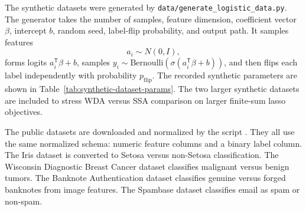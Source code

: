 \documentclass[11pt]{article}
\begin{document}
The synthetic datasets were generated by \texttt{data/generate\_logistic\_data.py}.
The generator takes the number of samples, feature dimension, coefficient
vector \(\beta\), intercept \(b\), random seed, label-flip probability, and
output path.  It samples features
\[
    a_i\sim N(0,I),
\]
forms logits \(a_i^{\mathsf T}\beta+b\), samples
\(y_i\sim\mathrm{Bernoulli}(\sigma(a_i^{\mathsf T}\beta+b))\), and then flips
each label independently with probability \(p_{\mathrm{flip}}\).  The recorded
synthetic parameters are shown in Table~\ref{tab:synthetic-dataset-params}.
The two larger synthetic datasets are included to stress WDA
versus SSA comparison on larger finite-sum lasso objectives.

The public datasets are downloaded and normalized by the script
.  They all use the same normalized
schema: numeric feature columns and a binary label column.  The Iris dataset is
converted to Setosa versus non-Setosa classification.  The Wisconsin Diagnostic
Breast Cancer dataset classifies malignant versus benign tumors.  The Banknote
Authentication dataset classifies genuine versus forged banknotes from image
features.  The Spambase dataset classifies email as spam or non-spam.

\begin{table}[htbp]
\centering
\small
{}
\caption{Logistic regression datasets used by the lasso experiments.}
\label{tab:logistic-datasets}
\end{table}
\end{document}
